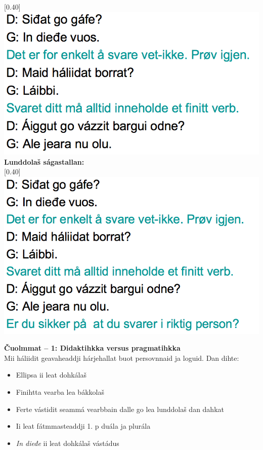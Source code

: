 \documentclass[landscape,norsk,11pt]{seminar}
\begin{document}
\begin{slide}
\scalebox{0.40}[0.40]{\includegraphics{img/lgiella5.png}} 
\newslide
\textbf{Lunddolaš ságastallan:} \\

\scalebox{0.40}[0.40]{\includegraphics{img/lgiella6.png}} 


\newslide
\textbf{Čuolmmat -- 1: Didaktihkka versus pragmatihkka} \\
Mii háliidit geavaheaddji hárjehallat buot persovnnaid ja loguid. Dan dihte:
\begin{itemize}
\item{Ellipsa ii leat dohkálaš}
\item{Finihtta vearba lea bákkolaš}
\item{Ferte vástidit seammá vearbbain dalle go lea lunddolaš dan dahkat}
\item{Ii leat fátmmasteaddji 1. p duála ja plurála }
\item{\textit{In dieđe} ii leat dohkálaš vástádus}
\end{itemize}





\end{slide}
\end{document}
